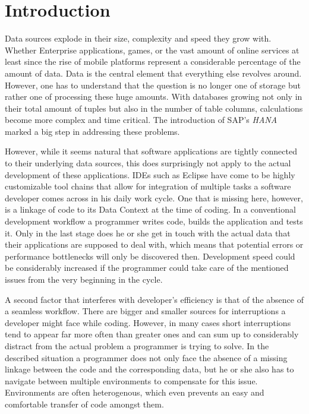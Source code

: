 
\section[Introduction (Author: Patrick Schilf)]{Introduction}
Data sources explode in their size, complexity and speed they grow with. Whether Enterprise applications, games, or the vast amount of online services at least since the rise of mobile platforms represent a considerable percentage of the amount of data. Data is the central element that everything else revolves around. However, one has to understand that the question is no longer one of storage but rather one of processing these huge amounts. With databases growing not only in their total amount of tuples but also in the number of table columns, calculations become more complex and time critical. The introduction of SAP's \emph{HANA} marked a big step in addressing these problems. 

However, while it seems natural that software applications are tightly connected to their underlying data sources, this does surprisingly not apply to the actual development of these applications. IDEs such as Eclipse have come to be highly customizable tool chains that allow for integration of multiple tasks a software developer comes across in his daily work cycle. One that is missing here, however, is a linkage of code to its Data Context at the time of coding. In a conventional development workflow a programmer writes code, builds the application and tests it. Only in the last stage does he or she get in touch with the actual data that their applications are supposed to deal with, which means that potential errors or performance bottlenecks will only be discovered then. Development speed could be considerably increased if the programmer could take care of the mentioned issues from the very beginning in the cycle.

A second factor that interferes with developer's efficiency is that of the absence of a seamless workflow. There are bigger and smaller sources for interruptions a developer might face while coding. However, in many cases short interruptions tend to appear far more often than greater ones and can sum up to considerably distract from the actual problem a programmer is trying to solve. In the described situation a programmer does not only face the absence of a missing linkage between the code and the corresponding data, but he or she also has to navigate between multiple environments to compensate for this issue. Environments are often heterogenous, which even prevents an easy and comfortable transfer of code amongst them.

